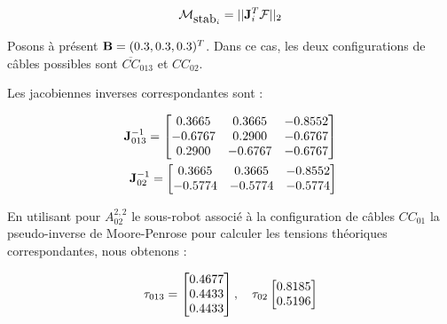 \begin{equation}
\mathcal M_{\hbox{stab}_i} = ||{\bf J}^T_i {\boldmath {\mathcal F}}||_2
\label{chap01:eq07}
\end{equation}

Posons à présent ${\bf B} = (0.3,0.3,0.3)^T$. Dans ce cas, les deux 
configurations de câbles possibles sont $\overline{CC}_{013}$ et $CC_{02}$.

Les jacobiennes inverses correspondantes sont :

\begin{equation}
\begin{split}
{\bf J}^{-1}_{013} = 
\begin{bmatrix}
0.3665 & 0.3665 & -0.8552 \\  
-0.6767 & 0.2900 & -0.6767 \\  
0.2900 & -0.6767 & -0.6767
\end{bmatrix} \\
{\bf J}^{-1}_{02} = 
\begin{bmatrix}
0.3665 & 0.3665 & -0.8552 \\  
-0.5774 & -0.5774 & -0.5774
\end{bmatrix}
\end{split}
\label{chap01:eq08}
\end{equation}

En utilisant pour $A^{2,2}_{02}$ le sous-robot associé à la configuration de 
câbles $CC_{01}$ la pseudo-inverse de Moore-Penrose pour calculer les tensions 
théoriques correspondantes, nous obtenons :

\begin{equation}
{\bf \tau}_{013} = 
\begin{bmatrix}
0.4677 \\
0.4433 \\
0.4433
\end{bmatrix},
\quad
{\bf \tau}_{02}
\begin{bmatrix}
0.8185 \\ 
0.5196 
\end{bmatrix}
\label{chap01:eq09}
\end{equation}

